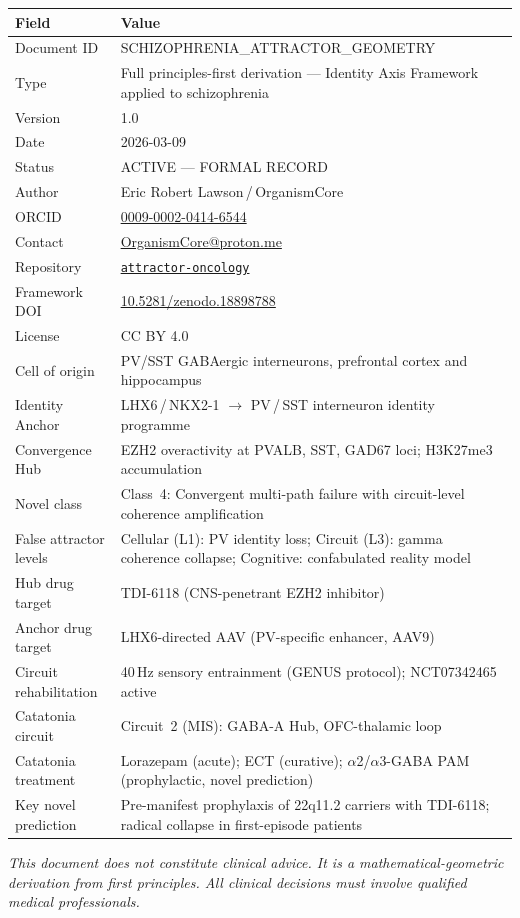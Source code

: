 \documentclass[12pt,a4paper]{article}
\begin{document}
\begin{center}
\begin{tabular}{p{4.2cm}p{9.2cm}}
\toprule
\textbf{Field} & \textbf{Value} \\
\midrule
Document ID &
SCHIZOPHRENIA\_ATTRACTOR\_GEOMETRY \\
Type &
Full principles-first derivation ---
Identity Axis Framework applied to schizophrenia \\
Version & 1.0 \\
Date & 2026-03-09 \\
Status & ACTIVE --- FORMAL RECORD \\
Author & Eric Robert Lawson\,/\,OrganismCore \\
ORCID &
\href{https://orcid.org/0009-0002-0414-6544}
{0009-0002-0414-6544} \\
Contact &
\href{mailto:OrganismCore@proton.me}
{OrganismCore@proton.me} \\
Repository &
\href{https://github.com/Eric-Robert-Lawson/attractor-oncology}
{\texttt{attractor-oncology}} \\
Framework DOI &
\href{https://doi.org/10.5281/zenodo.18898788}
{10.5281/zenodo.18898788} \\
License & CC BY 4.0 \\
\midrule
Cell of origin &
PV/SST GABAergic interneurons,
prefrontal cortex and hippocampus \\
Identity Anchor &
LHX6\,/\,NKX2-1 $\to$ PV\,/\,SST interneuron
identity programme \\
Convergence Hub &
EZH2 overactivity at PVALB, SST, GAD67 loci;
H3K27me3 accumulation \\
Novel class &
Class~4: Convergent multi-path failure with
circuit-level coherence amplification \\
False attractor levels &
Cellular (L1): PV identity loss;
Circuit (L3): gamma coherence collapse;
Cognitive: confabulated reality model \\
Hub drug target &
TDI-6118 (CNS-penetrant EZH2 inhibitor) \\
Anchor drug target &
LHX6-directed AAV (PV-specific enhancer,
AAV9) \\
Circuit rehabilitation &
40\,Hz sensory entrainment (GENUS protocol);
NCT07342465 active \\
Catatonia circuit &
Circuit~2 (MIS): GABA-A Hub, OFC-thalamic loop \\
Catatonia treatment &
Lorazepam (acute); ECT (curative);
$\alpha$2/$\alpha$3-GABA PAM (prophylactic,
novel prediction) \\
\midrule
Key novel prediction &
Pre-manifest prophylaxis of 22q11.2 carriers
with TDI-6118; radical collapse in first-episode
patients \\
\bottomrule
\end{tabular}
\end{center}

\bigskip\noindent
\textit{This document does not constitute clinical advice.
It is a mathematical-geometric derivation from first
principles. All clinical decisions must involve qualified
medical professionals.}
\end{document}
